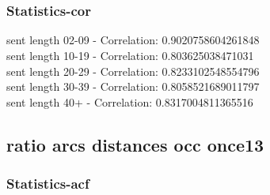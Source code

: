 \documentclass{article}%
\begin{document}
\begin{figure}[ht]%
\centering%
\setlength{\abovecaptionskip}{-35pt}%
%
%
\\%
%
%
\\%
%
\end{figure}

%
\newpage%
\subsubsection{Statistics{-}cor}%
\label{ssubsec:Statistics{-}cor}%
\noindent%
sent length 02-09 - Correlation: 0.9020758604261848\\%
sent length 10-19 - Correlation: 0.803625038471031\\%
sent length 20-29 - Correlation: 0.8233102548554796\\%
sent length 30-39 - Correlation: 0.8058521689011797\\%
sent length 40+ - Correlation: 0.8317004811365516\\

%
\newpage

%
\subsection{ratio arcs distances occ once13}%
\label{subsec:ratioarcsdistancesocconce13}%
\subsubsection{Statistics{-}acf}%
\label{ssubsec:Statistics{-}acf}%
\end{document}
